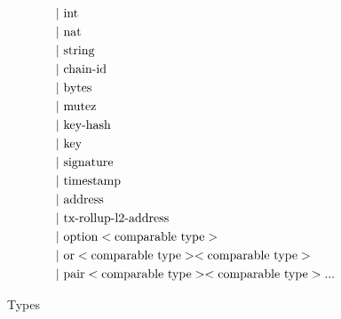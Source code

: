 \documentclass[runningheads]{llncs}
\begin{document}
\begin{figure} []
\begin{align*}
   &\text{$\mid$}\ \text{int}\\
   &\text{$\mid$}\ \text{nat}\\
   &\text{$\mid$}\ \text{string}\\
   &\text{$\mid$}\ \text{chain-id}\\
   &\text{$\mid$}\ \text{bytes}\\
   &\text{$\mid$}\ \text{mutez}\\
   &\text{$\mid$}\ \text{key-hash}\\
   &\text{$\mid$}\ \text{key}\\
   &\text{$\mid$}\ \text{signature}\\
   &\text{$\mid$}\ \text{timestamp}\\
   &\text{$\mid$}\ \text{address}\\
   &\text{$\mid$}\ \text{tx-rollup-l2-address}\\
   &\text{$\mid$}\ \text{option} <\text{comparable type}>\\
   &\text{$\mid$}\ \text{or} <\text{comparable type}> <\text{comparable type}>\\
   &\text{$\mid$}\ \text{pair} <\text{comparable type}> <\text{comparable type}> \text{$...$} \\
\end{align*}
\caption{Types}
\label{fig:type}
\end{figure}
\end{document}

